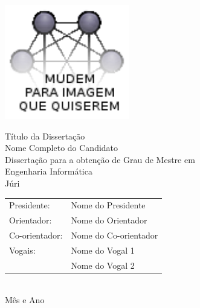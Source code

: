 \begin{center}
%
\vspace{2.5cm}
\includegraphics[height=50mm]{Figures/frontImage.png}

\vspace{0.8cm}
{\FontLb Título da Dissertação} \\
\vspace{2.6cm}
{\FontMb Nome Completo do Candidato} \\
\vspace{1.9cm}
{\FontLn Disserta\c{c}\~{a}o para a obten\c{c}\~{a}o de Grau de Mestre em} \\
\vspace{0.3cm}
{\FontLb Engenharia Informática} \\
\vspace{1.9cm}
{\FontMb J\'{u}ri} \\
\vspace{0.3cm}
{\FontSn %
\begin{tabular}{ll}
Presidente: & Nome do Presidente \\
Orientador: & Nome do Orientador \\
Co-orientador: & Nome do Co-orientador \\
Vogais: & Nome do Vogal 1 \\
        & Nome do Vogal 2 \\
\end{tabular} } \\
\vspace{1.5cm}
{\FontMb M\^{e}s e Ano} \\
%
\end{center}

\cleardoublepage

